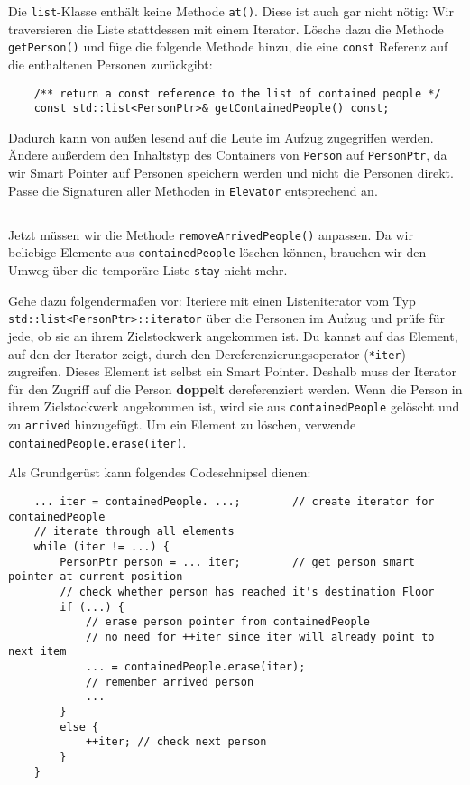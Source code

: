 Die \lstinline{list}-Klasse enthält keine Methode \lstinline{at()}.
Diese ist auch gar nicht nötig:
Wir traversieren die Liste stattdessen mit einem Iterator.
Lösche dazu die Methode \lstinline{getPerson()} und füge die folgende Methode hinzu, die eine \lstinline{const} Referenz auf die enthaltenen Personen zurückgibt:

\begin{lstlisting}
	/** return a const reference to the list of contained people */
	const std::list<PersonPtr>& getContainedPeople() const;
\end{lstlisting}

Dadurch kann von außen lesend auf die Leute im Aufzug zugegriffen werden.
Ändere außerdem den Inhaltstyp des Containers von \lstinline{Person} auf \lstinline{PersonPtr}, da wir Smart Pointer auf Personen speichern werden und nicht die Personen direkt.
Passe die Signaturen aller Methoden in \lstinline{Elevator} entsprechend an.

\subsection{}
Jetzt müssen wir die Methode \lstinline{removeArrivedPeople()} anpassen.
Da wir beliebige Elemente aus \lstinline{containedPeople} löschen können, brauchen wir den Umweg über die temporäre Liste \lstinline{stay} nicht mehr.

Gehe dazu folgendermaßen vor:
Iteriere mit einen Listeniterator vom Typ \lstinline{std::list<PersonPtr>::iterator} über die Personen im Aufzug und prüfe für jede, ob sie an ihrem Zielstockwerk angekommen ist.
Du kannst auf das Element, auf den der Iterator zeigt, durch den Dereferenzierungsoperator (\lstinline{*iter}) zugreifen.
Dieses Element ist selbst ein Smart Pointer.
Deshalb muss der Iterator für den Zugriff auf die Person \textbf{doppelt} dereferenziert werden.
Wenn die Person in ihrem Zielstockwerk angekommen ist, wird sie aus \lstinline{containedPeople} gelöscht und zu \lstinline{arrived} hinzugefügt.
Um ein Element zu löschen, verwende \lstinline{containedPeople.erase(iter)}.


Als Grundgerüst kann folgendes Codeschnipsel dienen:

\begin{lstlisting}
	... iter = containedPeople. ...;		// create iterator for containedPeople
	// iterate through all elements
	while (iter != ...) {
		PersonPtr person = ... iter; 		// get person smart pointer at current position
		// check whether person has reached it's destination Floor
		if (...) {
			// erase person pointer from containedPeople
			// no need for ++iter since iter will already point to next item
			... = containedPeople.erase(iter);
			// remember arrived person
			...
		}
		else {
			++iter; // check next person
		}
	}
\end{lstlisting}


